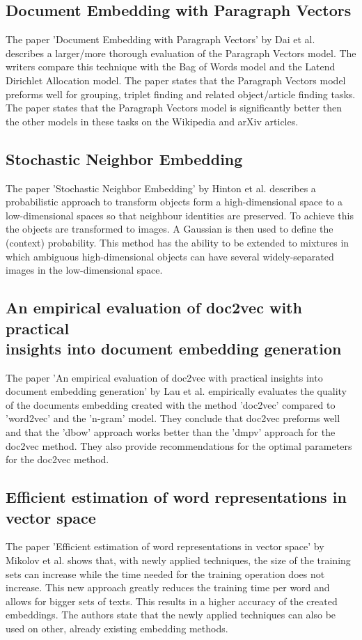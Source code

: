 \documentclass[10pt,a4paper]{article}
\begin{document}
\subsection{Document Embedding with Paragraph Vectors}
The paper 'Document Embedding with Paragraph Vectors' by Dai et al.\cite{dai2015document} describes a larger/more thorough evaluation of the Paragraph Vectors model. The writers compare this technique with the Bag of Words model and the Latend Dirichlet Allocation model. The paper states that the Paragraph Vectors model preforms well for grouping, triplet finding and related object/article finding tasks. The paper states that the Paragraph Vectors model is significantly better then the other models in these tasks on the Wikipedia and arXiv articles.
\subsection{Stochastic Neighbor Embedding}
The paper 'Stochastic Neighbor Embedding' by Hinton et al.\cite{hinton2003stochastic} describes a probabilistic approach to transform objects form a high-dimensional space to a low-dimensional spaces so that  neighbour identities are preserved. To achieve this the objects are transformed to images. A Gaussian is then used to define the (context) probability. This method has the ability to be extended to mixtures in which ambiguous high-dimensional objects can have several widely-separated images in the low-dimensional space.
\subsection{An empirical evaluation of doc2vec with practical \\insights into document embedding generation}
The paper 'An empirical evaluation of doc2vec with practical insights into document embedding generation' by Lau et al.\cite{lau2016empirical} empirically evaluates the quality of the documents embedding created with the method 'doc2vec' compared to 'word2vec' and the 'n-gram' model. They conclude that doc2vec preforms well and that the 'dbow' approach works better than the 'dmpv' approach for the doc2vec method. They also provide recommendations for the optimal parameters for the doc2vec method.
\subsection{Efficient estimation of word representations in vector space}
The paper 'Efficient estimation of word representations in vector space' by Mikolov et al.\cite{mikolov2013efficient} 
shows that, with newly applied techniques, the size of the training sets can increase while the time needed for the training operation does not increase. This new approach greatly reduces the training time per word and allows for bigger sets of texts. This results in a higher accuracy of the created embeddings. The authors state that the newly applied techniques can also be used on other, already existing embedding methods. 
\end{document}
